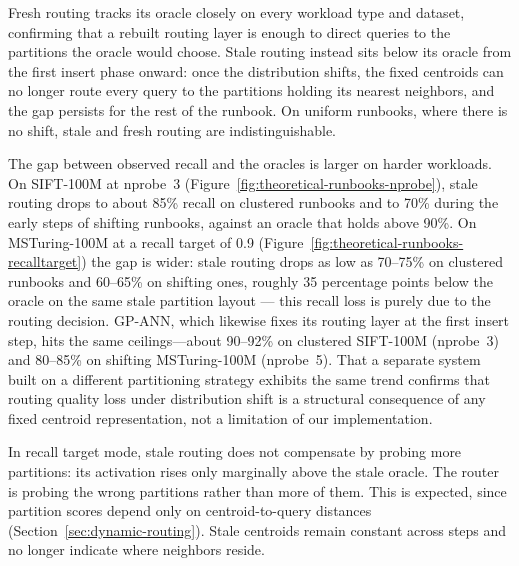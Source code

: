 \documentclass[sigconf,review,anonymous]{acmart}
\begin{document}


Fresh routing tracks its oracle closely on every workload type and dataset, confirming that a rebuilt routing layer is enough to direct queries to the partitions the oracle would choose. Stale routing instead sits below its oracle from the first insert phase onward: once the distribution shifts, the fixed centroids can no longer route every query to the partitions holding its nearest neighbors, and the gap persists for the rest of the runbook. On uniform runbooks, where there is no shift, stale and fresh routing are indistinguishable.

The gap between observed recall and the oracles is larger on harder workloads. On SIFT-100M at nprobe~3 (Figure~\ref{fig:theoretical-runbooks-nprobe}), stale routing drops to about 85\% recall on clustered runbooks and to 70\% during the early steps of shifting runbooks, against an oracle that holds above 90\%. On MSTuring-100M at a recall target of 0.9 (Figure~\ref{fig:theoretical-runbooks-recalltarget}) the gap is wider: stale routing drops as low as 70--75\% on clustered runbooks and 60--65\% on shifting ones, roughly 35 percentage points below the oracle on the same stale partition layout --- this recall loss is purely due to the routing decision. GP-ANN, which likewise fixes its routing layer at the first insert step, hits the same ceilings---about 90--92\% on clustered SIFT-100M (nprobe~3) and 80--85\% on shifting MSTuring-100M (nprobe~5). That a separate system built on a different partitioning strategy exhibits the same trend confirms that routing quality loss under distribution shift is a structural consequence of any fixed centroid representation, not a limitation of our implementation.

In recall target mode, stale routing does not compensate by probing more partitions: its activation rises only marginally above the stale oracle. The router is probing the wrong partitions rather than more of them. This is expected, since partition scores depend only on centroid-to-query distances (Section~\ref{sec:dynamic-routing}). Stale centroids remain constant across steps and no longer indicate where neighbors reside.
\end{document}
